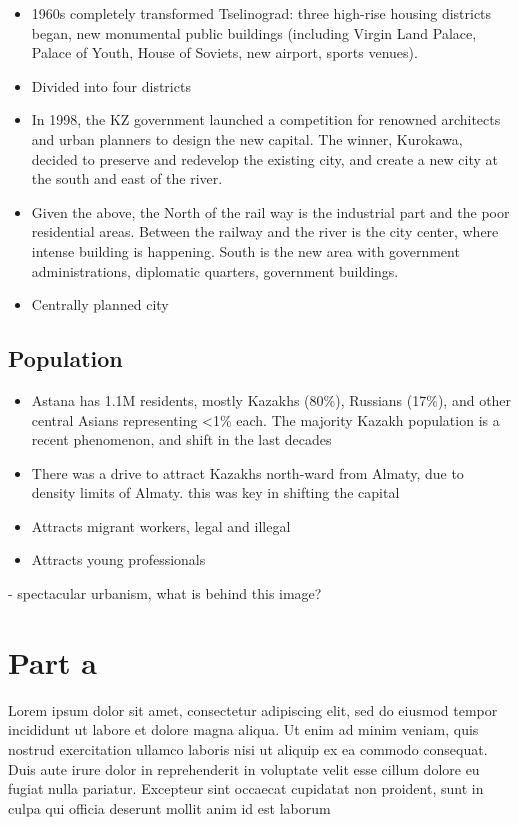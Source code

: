 \documentclass[12pt]{article}
\begin{document}
\begin{itemize}
  \item 1960s completely transformed Tselinograd: three high-rise housing districts began, new monumental public buildings (including Virgin Land Palace, Palace of Youth, House of Soviets, new airport, sports venues).
  \item Divided into four districts
  \item In 1998, the KZ government launched a competition for renowned architects and urban planners to design the new capital. The winner, Kurokawa, decided to preserve and redevelop the existing city, and create a new city at the south and east of the river. 
  \item Given the above, the North of the rail way is the industrial part and the poor residential areas. Between the railway and the river is the city center, where intense building is happening. South is the new area with government administrations, diplomatic quarters, government buildings.
  \item Centrally planned city
\end{itemize}

\subsection{Population}

\begin{itemize}
  \item Astana has 1.1M residents, mostly Kazakhs (80\%), Russians (17\%), and other central Asians representing <1\% each. The majority Kazakh population is a recent phenomenon, and shift in the last decades
  \item There was a drive to attract Kazakhs north-ward from Almaty, due to density limits of Almaty. this was key in shifting the capital
  \item Attracts migrant workers, legal and illegal
  \item Attracts young professionals
\end{itemize}


- spectacular urbanism, what is behind this image?



\section*{Part a}

Lorem ipsum dolor sit amet, consectetur adipiscing elit, sed do eiusmod tempor incididunt ut labore et dolore magna aliqua. Ut enim ad minim veniam, quis nostrud exercitation ullamco laboris nisi ut aliquip ex ea commodo consequat. Duis aute irure dolor in reprehenderit in voluptate velit esse cillum dolore eu fugiat nulla pariatur. Excepteur sint occaecat cupidatat non proident, sunt in culpa qui officia deserunt mollit anim id est laborum
\end{document}
